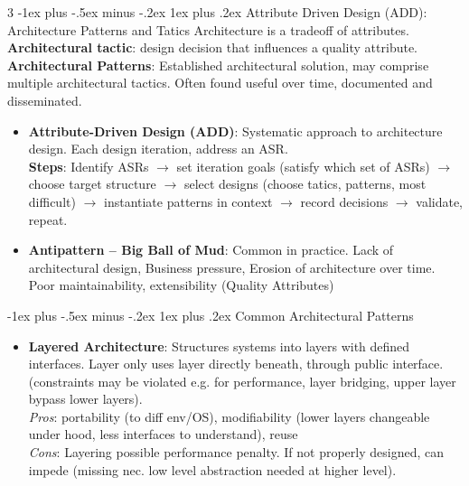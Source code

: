\documentclass[a4paper, 10pt, landscape]{article}
\makeatletter
\renewcommand{\subsubsection}{\@startsection{subsubsection}{3}{0mm}%
                                {-1ex plus -.5ex minus -.2ex}%
                                {1ex plus .2ex}%
                                {\normalfont\small\bfseries}}
\makeatother
\begin{document}
\begin{multicols*}{3}
\subsubsection{Attribute Driven Design (ADD): Architecture Patterns and Tatics}
Architecture is a tradeoff of attributes. \\
\textbf{Architectural tactic}: design decision that influences a quality attribute. \\
\textbf{Architectural Patterns}: Established architectural solution, may comprise multiple architectural tactics. Often found useful over time, documented and disseminated.
\begin{itemize}
\item \textbf{Attribute-Driven Design (ADD)}: Systematic approach to architecture design. Each design iteration, address an ASR. \\
\textbf{Steps}: Identify ASRs $\rightarrow$ set iteration goals (satisfy which set of ASRs) $\rightarrow$ choose target structure $\rightarrow$ select designs (choose tatics, patterns, most difficult) $\rightarrow$ instantiate patterns in context $\rightarrow$ record decisions $\rightarrow$ validate, repeat.
\end{itemize}
\begin{itemize}
\item \textbf{Antipattern -- Big Ball of Mud}: Common in practice. Lack of architectural design, Business pressure, Erosion of architecture over time. 
Poor maintainability, extensibility (Quality Attributes)
\end{itemize}

\subsubsection{Common Architectural Patterns}
\begin{itemize}
	\item \textbf{Layered Architecture}: Structures systems into layers with defined interfaces. Layer only uses layer directly beneath, through public interface. (constraints may be violated e.g. for performance, layer bridging, upper layer bypass lower layers). \\
	 \textit{Pros}: portability (to diff env/OS), modifiability (lower layers changeable under hood, less interfaces to understand), reuse\\
	 \textit{Cons}: Layering possible performance penalty. If not properly designed, can impede (missing nec. low level abstraction needed at higher level).
	 

\end{itemize}
\end{multicols*}
\end{document}
